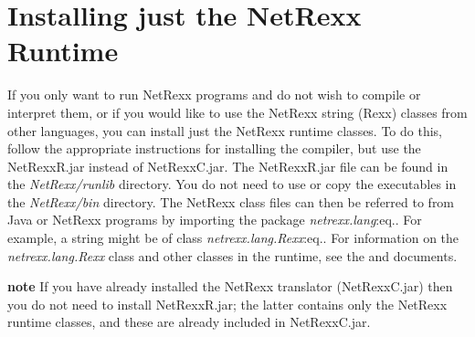 \section{Installing just the NetRexx Runtime}
If you only want to run NetRexx programs and do not wish to compile or
interpret them, or if you would like to use the NetRexx string (Rexx)
classes from other languages, you can install just the NetRexx runtime
classes.
\newline
To do this, follow the appropriate instructions for installing the
compiler, but use the NetRexxR.jar instead of NetRexxC.jar.
The NetRexxR.jar file can be found in the \emph{NetRexx/runlib} directory.
\newline
You do not need to use or copy the executables in the \emph{NetRexx/bin}
directory.
\newline
The NetRexx class files can then be referred to from Java or NetRexx
programs by importing the package \emph{netrexx.lang}:eq..  For
example, a string might be of class \emph{netrexx.lang.Rexx}:eq..
\newline
For information on the \emph{netrexx.lang.Rexx} class and other classes
in the runtime, see the \cite{NetRexx Language} and \cite{NetRexx
Supplement} documents.

\textbf{note} If you have already installed the NetRexx translator
(NetRexxC.jar) then you do not need to install NetRexxR.jar; the latter
contains only the NetRexx runtime classes, and these are already
included in NetRexxC.jar.

